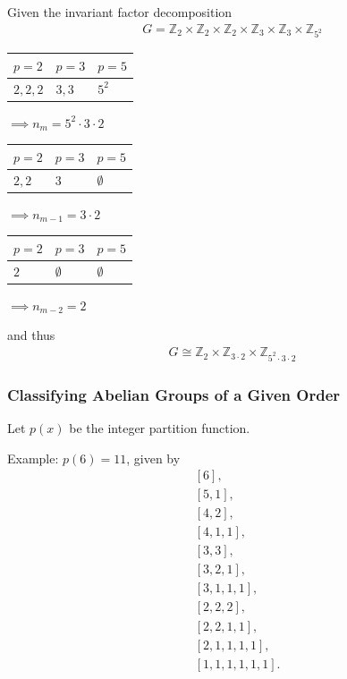 \begin{example}

Given the invariant factor decomposition
\begin{align*}
G = {{\mathbb{Z}}_{2}\times{\mathbb{Z}}_{2}\times{\mathbb{Z}}_{2}\times{\mathbb{Z}}_{3}\times{\mathbb{Z}}_{3}\times{\mathbb{Z}}_{5^2}}
\end{align*}

\begin{longtable}[]{@{}lll@{}}
\toprule
\(p = 2\) & \(p= 3\) & \(p =5\)\tabularnewline
\midrule
\endhead
\(2,2,2\) & \(3,3\) & \(5^2\)\tabularnewline
\bottomrule
\end{longtable}

\(\implies n_m = 5^2 \cdot 3 \cdot 2\)

\begin{longtable}[]{@{}lll@{}}
\toprule
\(p = 2\) & \(p= 3\) & \(p =5\)\tabularnewline
\midrule
\endhead
\(2,2\) & \(3\) & \(\emptyset\)\tabularnewline
\bottomrule
\end{longtable}

\(\implies n_{m-1} = 3 \cdot 2\)

\begin{longtable}[]{@{}lll@{}}
\toprule
\(p = 2\) & \(p= 3\) & \(p =5\)\tabularnewline
\midrule
\endhead
\(2\) & \(\emptyset\) & \(\emptyset\)\tabularnewline
\bottomrule
\end{longtable}

\(\implies n_{m-2} = 2\)

and thus
\begin{align*}
G\cong {\mathbb{Z}}_2 \times {\mathbb{Z}}_{3\cdot 2} \times {\mathbb{Z}}_{5^2 \cdot 3 \cdot 2}
\end{align*}

\end{example}

\hypertarget{classifying-abelian-groups-of-a-given-order}{%
\subsubsection{Classifying Abelian Groups of a Given
Order}\label{classifying-abelian-groups-of-a-given-order}}

Let \(p(x)\) be the integer partition function.

\begin{example}[?]

Example: \(p(6) = 11\), given by
\begin{align*}
&[6], \\
&[5, 1], \\
&[4, 2], \\
&[4, 1, 1], \\
&[3, 3], \\
&[3, 2, 1], \\
&[3, 1, 1, 1], \\
&[2, 2, 2], \\
&[2, 2, 1, 1], \\
&[2, 1, 1, 1, 1], \\
&[1, 1, 1, 1, 1, 1]
.\end{align*}

\end{example}

